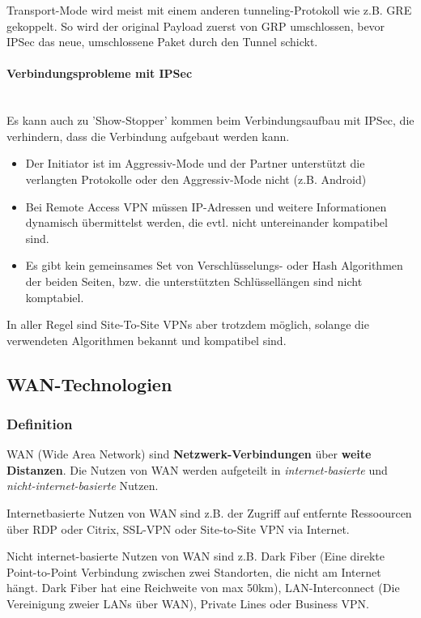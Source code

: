 \documentclass[a4paper, 11pt]{article}
\begin{document}
Transport-Mode wird meist mit einem anderen tunneling-Protokoll wie z.B. GRE gekoppelt. So wird der original Payload zuerst von GRP umschlossen, bevor IPSec das neue, umschlossene Paket durch den Tunnel schickt.

\paragraph{Verbindungsprobleme mit IPSec} \mbox{} \\
Es kann auch zu 'Show-Stopper' kommen beim Verbindungsaufbau mit IPSec, die verhindern, dass die Verbindung aufgebaut werden kann.

\begin{itemize}
	\item Der Initiator ist im Aggressiv-Mode und der Partner unterstützt die verlangten Protokolle oder den Aggressiv-Mode nicht (z.B. Android)
	\item Bei Remote Access VPN müssen IP-Adressen und weitere Informationen dynamisch übermittelst werden, die evtl. nicht untereinander kompatibel sind.
	\item Es gibt kein gemeinsames Set von Verschlüsselungs- oder Hash Algorithmen der beiden Seiten, bzw. die unterstützten Schlüssellängen sind nicht komptabiel.
\end{itemize}

In aller Regel sind Site-To-Site VPNs aber trotzdem möglich, solange die verwendeten Algorithmen bekannt und kompatibel sind.

\newpage

\subsection{WAN-Technologien}
\subsubsection{Definition}
WAN (Wide Area Network) sind \textbf{Netzwerk-Verbindungen} über \textbf{weite Distanzen}. Die Nutzen von WAN werden aufgeteilt in \textit{internet-basierte} und \textit{nicht-internet-basierte} Nutzen.
\vspace{10px}
  
\noindent  Internetbasierte Nutzen von WAN sind z.B. der Zugriff auf entfernte Ressoourcen über RDP oder Citrix, SSL-VPN oder Site-to-Site VPN via Internet.

\vspace{10px}

\noindent Nicht internet-basierte Nutzen von WAN sind z.B. Dark Fiber (Eine direkte Point-to-Point Verbindung zwischen zwei Standorten, die nicht am Internet hängt. Dark Fiber hat eine Reichweite von max 50km), LAN-Interconnect (Die Vereinigung zweier LANs über WAN), Private Lines oder Business VPN.
\end{document}

